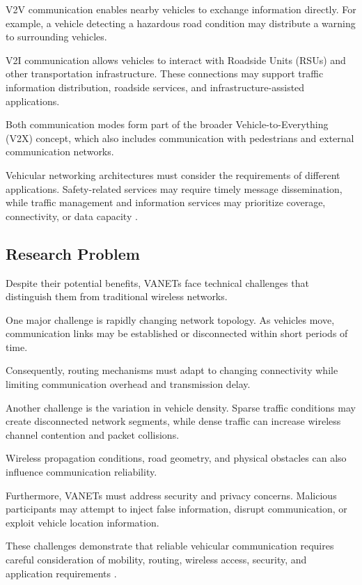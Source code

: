V2V communication enables nearby vehicles
to exchange information directly.
For example, a vehicle detecting a
hazardous road condition may distribute
a warning to surrounding vehicles.

V2I communication allows vehicles
to interact with Roadside Units (RSUs)
and other transportation infrastructure.
These connections may support
traffic information distribution,
roadside services, and
infrastructure-assisted applications.

Both communication modes form part
of the broader Vehicle-to-Everything
(V2X) concept, which also includes
communication with pedestrians
and external communication networks.

Vehicular networking architectures
must consider the requirements
of different applications.
Safety-related services may require
timely message dissemination,
while traffic management and
information services may prioritize
coverage, connectivity, or
data capacity \cite{Karagiannis2011}.

\subsection{Research Problem}

Despite their potential benefits,
VANETs face technical challenges
that distinguish them from
traditional wireless networks.

One major challenge is
rapidly changing network topology.
As vehicles move, communication
links may be established or
disconnected within short
periods of time.

Consequently, routing mechanisms
must adapt to changing
connectivity while limiting
communication overhead
and transmission delay.

Another challenge is
the variation in vehicle density.
Sparse traffic conditions
may create disconnected
network segments, while
dense traffic can increase
wireless channel contention
and packet collisions.

Wireless propagation conditions,
road geometry, and physical
obstacles can also influence
communication reliability.

Furthermore, VANETs must
address security and privacy
concerns. Malicious participants
may attempt to inject
false information,
disrupt communication,
or exploit vehicle
location information.

These challenges demonstrate
that reliable vehicular
communication requires
careful consideration
of mobility, routing,
wireless access,
security, and
application requirements
\cite{Zeadally2012,Karagiannis2011}.

